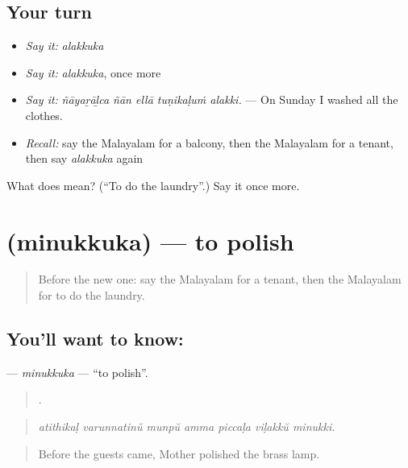 \subsection*{Your turn}
\begin{itemize}
\raggedright
  \item \emph{Say it:} \emph{alakkuka}
  \item \emph{Say it:} \emph{alakkuka}, once more
  \item \emph{Say it:} \emph{ñāyaṟāḻca ñān ellā tuṇikaḷuṁ alakki.} — On Sunday I washed all the clothes.
  \item \emph{Recall:} say the Malayalam for a balcony, then the Malayalam for a tenant, then say \emph{alakkuka} again
\end{itemize}

\begin{tcolorbox}[breakable,colback=teal!4,colframe=teal!35!black,title={Before you move on}]
What does  mean? (\textquotedblleft{}To do the laundry\textquotedblright{}.) Say it once more.
\end{tcolorbox}
\section[\texorpdfstring{\ml{മിനുക്കുക} (minukkuka)}{മിനുക്കുക (minukkuka)}]{ (minukkuka) — to polish}

\label{lesson:ML-C570-minukkuka}



\begin{quote}
Before the new one: say the Malayalam for a tenant, then the Malayalam for to do the laundry.
\end{quote}

\subsection*{You'll want to know: }
\textbf{} — \emph{minukkuka} — \textquotedblleft{}to polish\textquotedblright{}.

\begin{quote}
      .
\end{quote}

\begin{quote}
\emph{atithikaḷ varunnatinŭ munpŭ amma piccaḷa viḷakkŭ minukki.}
\end{quote}

\begin{quote}
Before the guests came, Mother polished the brass lamp.
\end{quote}

